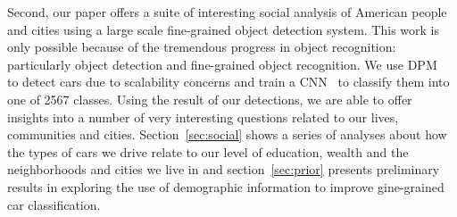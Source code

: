 \documentclass[10pt,twocolumn,letterpaper]{article}
\begin{document}
Second, our paper offers a suite of interesting social analysis of American people and cities using a large scale fine-grained object detection system. This work is only possible because of the tremendous progress in object recognition: particularly object detection and fine-grained object recognition. We use DPM~\cite{dpm}~\cite{dpm_web} to detect cars due to scalability concerns and train a CNN~\cite{alexnet} to classify them into one of 2567 classes. Using the result of our detections, we are able to offer insights into a number of very interesting questions related to our lives, communities and cities. Section~\ref{sec:social} shows a series of analyses about how the types of cars we drive relate to our level of education, wealth and the neighborhoods and cities we live in and section~\ref{sec:prior} presents preliminary results in exploring the use of demographic information to improve gine-grained car classification.



\end{document}
